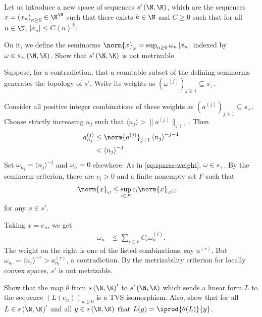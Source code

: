 \documentclass[10pt]{mypackage}
\begin{document}
\begin{problem}[Problem IV.3]
  Let us introduce a new space of sequences $s'\left( \N,\K \right)$, which are the sequences $x = \left( x_n \right)_{n\geq 0}\in \K^{\N}$ such that there exists $k\in \N$ and $C\geq 0$ such that for all $n\in \N$, $\left\vert x_n \right\vert\leq C \left\langle n \right\rangle^{k}$.

  On it, we define the seminorms $\norm{x}_{\omega} = \sup_{n\geq 0} \omega_n\left\vert x_n \right\vert$ indexed by $\omega\in s_{+}\left( \N,\K \right)$. Show that $s'\left( \N,\K \right)$ is not metrizable.
\end{problem}
\begin{solution}
  Suppose, for a contradiction, that a countable subset of the defining seminorms generates the topology of \(s'\). Write its weights as \((\omega^{(j)})_{j\ge1}\subseteq s_+\).

  Consider all positive integer combinations of these weights as \((a^{(j)})_{j\ge1}\subseteq s_+\). Choose strictly increasing \(n_j\) such that \(\langle n_j\rangle>\|a^{(j)}\|_{j+1}\). Then
  \begin{align*}
    a_{n_j}^{(j)} &\leq \norm{a^{(j)}}_{j+1} \left\langle n_j \right\rangle^{-j-1}\\
                  &< \left\langle n_j \right\rangle^{-j}.
  \end{align*}
Set \(\omega_{n_j}=\langle n_j\rangle^{-j}\) and \(\omega_n=0\) elsewhere. As in \eqref{eq:sparse-weight}, \(\omega\in s_+\). By the seminorm criterion, there are \(c_i>0\) and a finite nonempty set \(F\) such that
\begin{align*}
  \norm{x}_{\omega} &\leq \sup_{i\in F}c_i \norm{x}_{\omega^{(i)}}
\end{align*}
for any $x\in s'$.

Taking \(x=e_n\), we get
\begin{align*}
  \omega_n &\leq \sum_{i\in F} C_i \omega^{(i)}_{n}.
\end{align*}
The weight on the right is one of the listed combinations, say \(a^{(r)}\). But \(\omega_{n_r}=\langle n_r\rangle^{-r}>a^{(r)}_{n_r}\), a contradiction. By the metrizability criterion for locally convex spaces, \(s'\) is not metrizable.
\end{solution}
\begin{problem}[Problem IV.4]
  Show that the map $\theta$ from $s\left( \N,\K \right)'$ to $s'\left( \N,\K \right)$ which sends a linear form $L$ to the sequence $\left( L\left( e_n \right) \right)_{n\geq 0}$ is a TVS isomorphism. Also, show that for all $L\in s\left( \N,\K \right)'$ and all $y\in s\left( \N,\K \right)$ that $ L(y) = \iprod{\theta(L)}{y} $.
\end{problem}
\end{document}
